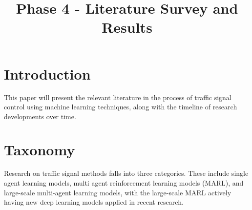 \documentclass[conference]{IEEEtran}
\begin{document}
\title{Phase 4 - Literature Survey and Results\\}

\author{
\and  
{}  
\and
{}  
\and
{}  
}

\maketitle

\section{Introduction}
This paper will present the relevant literature in the process of traffic signal control using machine learning techniques, along with the timeline of research developments over time.  

\section{Taxonomy}

Research on traffic signal methods falls into three categories. These include single agent learning models, multi agent reinforcement learning models (MARL), and large-scale multi-agent learning models, with the large-scale MARL actively having new deep learning models applied in recent research. 
\end{document}
